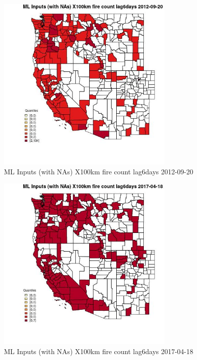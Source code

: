 \clearpage 

\begin{figure} 
\centering  
\includegraphics[width=0.77\textwidth]{Code_Outputs/Report_ML_input_PM25_Step4_part_e_de_duplicated_aves_compiled_2019-05-14wNAs_CountyX100km_fire_count_lag6daysMean2012-09-20_2012-09-20.jpg} 
\caption{\label{fig:Report_ML_input_PM25_Step4_part_e_de_duplicated_aves_compiled_2019-05-14wNAsCountyX100km_fire_count_lag6daysMean2012-09-20_2012-09-20}ML Inputs (with NAs) X100km fire count lag6days 2012-09-20} 
\end{figure} 
 

\begin{figure} 
\centering  
\includegraphics[width=0.77\textwidth]{Code_Outputs/Report_ML_input_PM25_Step4_part_e_de_duplicated_aves_compiled_2019-05-14wNAs_CountyX100km_fire_count_lag6daysMean2017-04-18_2017-04-18.jpg} 
\caption{\label{fig:Report_ML_input_PM25_Step4_part_e_de_duplicated_aves_compiled_2019-05-14wNAsCountyX100km_fire_count_lag6daysMean2017-04-18_2017-04-18}ML Inputs (with NAs) X100km fire count lag6days 2017-04-18} 
\end{figure} 
 

